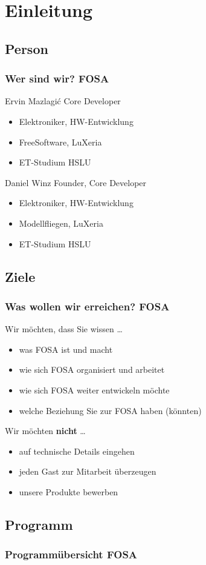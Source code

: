 \section{Einleitung}

\subsection{Person}
\begin{frame}
	\frametitle{Wer sind wir? \hfill{} \footnotesize{FOSA}}
	\begin{block}{Ervin Mazlagi\'c 
		\hfill{} 
		\footnotesize{Core Developer}}
		\begin{itemize}
			\item Elektroniker, HW-Entwicklung
			\item FreeSoftware, LuXeria
			\item ET-Studium HSLU
		\end{itemize}
	\end{block}
	\vfill{}
	\begin{block}{Daniel Winz
		\hfill{}
		\footnotesize{Founder, Core Developer}}
		\begin{itemize}
			\item Elektroniker, HW-Entwicklung
			\item Modellfliegen, LuXeria
			\item ET-Studium HSLU
		\end{itemize}
    	\end{block}
\end{frame}

\subsection{Ziele}
\begin{frame}
	\frametitle{Was wollen wir erreichen? \hfill{} \footnotesize{FOSA}}
	\begin{exampleblock}{Wir möchten, dass Sie wissen \dots}
		\begin{itemize}
			\item was FOSA ist und macht
			\item wie sich FOSA organisiert und arbeitet
			\item wie sich FOSA weiter entwickeln möchte
			\item welche Beziehung Sie zur FOSA haben (könnten)
		\end{itemize}
	\end{exampleblock}
	\vfill{}
	\begin{alertblock}{Wir möchten \textbf{nicht} \dots}
		\begin{itemize}
			\item auf technische Details eingehen
			\item jeden Gast zur Mitarbeit überzeugen
			\item unsere Produkte bewerben
		\end{itemize}
	\end{alertblock}
\end{frame}

\subsection{Programm}
\begin{frame}
    \frametitle{Programmübersicht \hfill{} \footnotesize{FOSA}}
    \tableofcontents
\end{frame}
